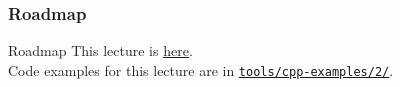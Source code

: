 \documentclass[aspectratio=169]{beamer}
\begin{document}
\frame{\titlepage}

\begin{frame}
  \frametitle{Roadmap}
  \tableofcontents
\end{frame}

\begin{frame}{Roadmap}
  This lecture is \href{https://github.com/robmasocco/DAFN26_Robotics_3}{\color{blue}\underline{here}}.\\
  \bigskip
  Code examples for this lecture are in \href{https://github.com/IntelligentSystemsLabUTV/ros2-examples/tree/jazzy/tools/cpp-examples/2}{\color{blue}\underline{\texttt{tools/cpp-examples/2/}}}.
\end{frame}








\end{document}
